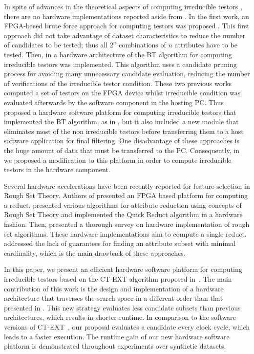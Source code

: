 \documentclass[authoryear,preprint,review,12pt]{elsarticle}
\begin{document}
In spite of advances in the theoretical aspects of computing
irreducible testors \citep{R5,R8,R9}, there are 
no hardware implementations reported aside from \citep{R10,R11,R21}.
In the first work, an FPGA-based brute force approach for computing testors was proposed
\citep{R10}. This first approach did not take advantage of dataset characteristics to reduce the number 
of candidates to be tested; thus all $2^n$ combinations of $n$ attributes have to be tested. 
Then, in \citep{R11} a hardware architecture of the BT algorithm \citep{R31} for computing irreducible 
testors was implemented. 
This algorithm uses a candidate pruning process for avoiding many unnecessary candidate evaluation, 
reducing the number of verifications of the irreducible testor condition. 
These two previous works computed a set of testors on the FPGA device whilst irreducible condition 
was evaluated afterwards by the software component in the hosting PC. 
Thus \cite{R21} proposed a hardware software platform for computing irreducible testors that 
implemented the BT algorithm, as in \citep{R11}, but it also included a new module that eliminates most of 
the non irreducible testors before transferring them to a host software application for final filtering. 
One disadvantage of these approaches is the huge amount of data that must be transferred to the PC.  
Consequently, in~\citep{Rod14} we proposed a modification to this platform in order to compute irreducible 
testors in the hardware component. 

Several hardware accelerations have been recently reported for feature selection in Rough Set Theory. Authors of
\citep{Grze13,Kop14} presented an FPGA based platform for computing a reduct. \cite{Tiwari13} presented various
algorithms for attribute reduction using concepts of Rough Set Theory and implemented the Quick Reduct
algorithm in a hardware fashion. Then, \cite{Tiwari14} presented a thorough survey on hardware implementation 
of rough set algorithms. These hardware implementations aim to compute a single reduct. 
\cite{Jensen14} addressed the lack of guarantees for finding an attribute subset with minimal cardinality, 
which is the main drawback of these approaches. 

In this paper, we present an efficient hardware software platform for computing irreducible
testors based on the CT-EXT algorithm proposed in~\citep{R22}. The main contribution of this
work is the design and implementation of a hardware architecture that traverses the search space in a 
different order than that presented in \citep{R11, R21,Rod14}. This new strategy evaluates less candidate
subsets than previous architectures, which results in shorter runtime. In comparison to the 
software versions of CT-EXT~\citep{R22, R23}, our proposal evaluates a candidate every clock cycle, which
leads to a faster execution. The runtime gain of our new hardware software platform is demonstrated throughout
experiments over synthetic datasets. 
\end{document}
